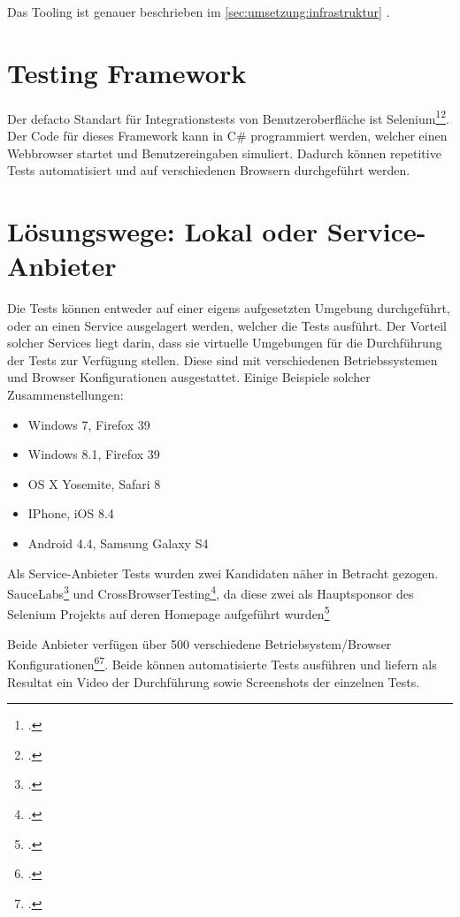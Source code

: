 Das Tooling ist genauer beschrieben im \cref{sec:umsetzung:infrastruktur} .

\section{Testing Framework}
\label{sec:Recherche:TestingFrameworks}
Der defacto Standart für Integrationstests von Benutzeroberfläche ist Selenium\footcite{Selenium_-_Web_Browser_Automation_2015-07-26}\footcite{Happy_10th_Birthday_Selenium_ThoughtWorks_2015-07-26}. Der Code für dieses Framework kann in C\# programmiert werden, welcher einen Webbrowser startet und Benutzereingaben simuliert. Dadurch können repetitive Tests automatisiert und auf verschiedenen Browsern durchgeführt werden.

\section{Lösungswege: Lokal oder Service-Anbieter}
\label{sec:Recherche:loesungswege}
Die Tests können entweder auf einer eigens aufgesetzten Umgebung durchgeführt, oder an einen Service ausgelagert werden, welcher die Tests ausführt. 
Der Vorteil solcher Services liegt darin, dass sie virtuelle Umgebungen für die Durchführung der Tests zur Verfügung stellen. Diese sind mit verschiedenen Betriebssystemen und Browser Konfigurationen ausgestattet. Einige Beispiele solcher Zusammenstellungen:
\begin{itemize}
\item Windows 7, Firefox 39
\item Windows 8.1, Firefox 39
\item OS X Yosemite, Safari 8
\item IPhone, iOS 8.4
\item Android 4.4, Samsung Galaxy S4
\end{itemize}

Als Service-Anbieter Tests wurden zwei Kandidaten näher in Betracht gezogen. SauceLabs\footcite{Sauce_Labs_2015-07-26} und CrossBrowserTesting\footcite{Cross_Browser_Testing_2015-07-26}, da diese zwei als Hauptsponsor des Selenium Projekts auf deren Homepage aufgeführt wurden\footcite{Seleniumhq}

Beide Anbieter verfügen über 500 verschiedene Betriebsystem/Browser Konfigurationen\footcite{Platforms_2015-07-26}\footcite{OS_Browser_Configurations_for_Cross_Browser_Compatibility_Testing_2015-07-26}. Beide können automatisierte Tests ausführen und liefern als Resultat ein Video der Durchführung sowie Screenshots der einzelnen Tests.

